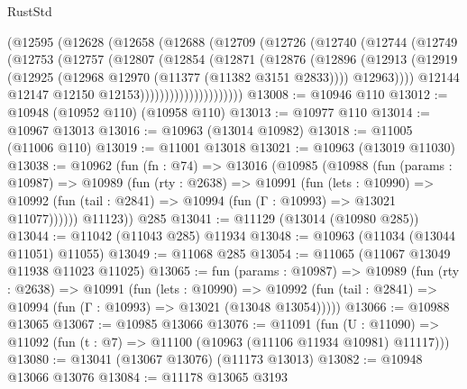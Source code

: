 \begin{lexlean}{RustStd}
\begin{coremodule}
                  (@12595
                    (@12628
                      (@12658
                        (@12688
                          (@12709
                            (@12726
                              (@12740
                                (@12744
                                  (@12749
                                    (@12753
                                      (@12757
                                        (@12807
                                          (@12854
                                            (@12871
                                              (@12876
                                                (@12896
                                                  (@12913
                                                    (@12919
                                                      (@12925
                                                        (@12968
                                                          @12970
                                                          (@11377 (@11382 @3151 @2833))))
                                                      @12963))))
                                              @12144
                                              @12147
                                              @12150
                                              @12153)))))))))))))))))))))
@13008 := @10946 @110
@13012 := @10948 (@10952 @110) (@10958 @110)
@13013 := @10977 @110
@13014 := @10967 @13013
@13016 := @10963 (@13014 @10982)
@13018 := @11005 (@11006 @110)
@13019 := @11001 @13018
@13021 := @10963 (@13019 @11030)
@13038 := @10962
    (fun (fn : @74) =>
    @13016
      (@10985
        (@10988
          (fun (params : @10987) =>
          @10989
            (fun (rty : @2638) =>
            @10991
              (fun (lets : @10990) =>
              @10992 (fun (tail : @2841) => @10994 (fun (Γ : @10993) => @13021 @11077))))))
        @11123))
    @285
@13041 := @11129 (@13014 (@10980 @285))
@13044 := @11042 (@11043 @285) @11934
@13048 := @10963 (@11034 (@13044 @11051) @11055)
@13049 := @11068 @285
@13054 := @11065 (@11067 @13049 @11938 @11023 @11025)
@13065 := fun (params : @10987) =>
  @10989
    (fun (rty : @2638) =>
    @10991
      (fun (lets : @10990) =>
      @10992 (fun (tail : @2841) => @10994 (fun (Γ : @10993) => @13021 (@13048 @13054)))))
@13066 := @10988 @13065
@13067 := @10985 @13066
@13076 := @11091
    (fun (U : @11090) => @11092 (fun (t : @7) => @11100 (@10963 (@11106 @11934 @10981) @11117)))
@13080 := @13041 (@13067 @13076) (@11173 @13013)
@13082 := @10948 @13066 @13076
@13084 := @11178 @13065 @3193

\end{coremodule}
\end{lexlean}
